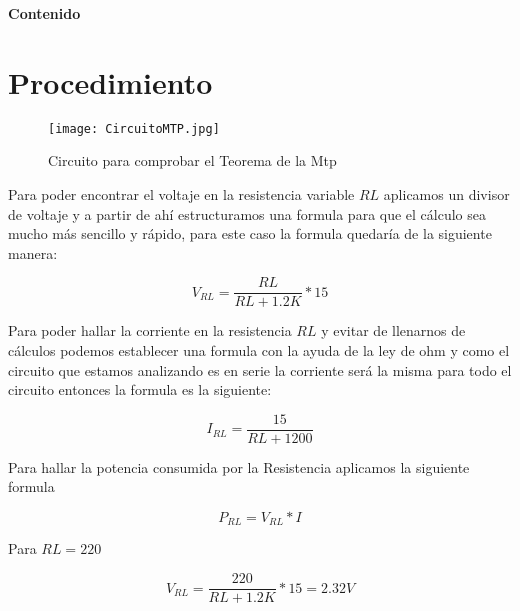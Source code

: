 \documentclass[a4paper, 11pt]{article}
\begin{document}
\textbf{}
\newpage

\begin{flushright}
\textbf{\Huge Contenido}
\end{flushright}

\renewcommand*\contentsname{}
{%
\tableofcontents
}



\newpage

\section{Procedimiento}

\begin{figure}[h]
\texttt{[image: CircuitoMTP.jpg]}
\caption{Circuito para comprobar el Teorema de la Mtp}
\end{figure}

Para poder encontrar el voltaje en la resistencia variable $RL$ aplicamos un divisor de voltaje y a partir de ahí estructuramos una formula para que el cálculo sea mucho más sencillo y rápido, para este caso la formula quedaría de la siguiente manera:

\begin{equation*}
V_{RL}=\frac{RL}{RL+1.2K}*15
\end{equation*}

Para poder hallar la corriente en la resistencia $RL$ y evitar de llenarnos de cálculos podemos establecer una formula con la ayuda de la ley de ohm y como el circuito que estamos analizando es en serie la corriente será la misma para  todo el circuito entonces la formula es  la siguiente:

\begin{equation*}
I_{RL}=\frac{15}{RL+1200}
\end{equation*}

Para hallar la potencia consumida por la Resistencia aplicamos la siguiente formula

\begin{equation*}
P_{RL}=V_{RL}*I
\end{equation*}

Para $RL=220$

\begin{equation*}
V_{RL}=\frac{220}{RL+1.2K}*15=2.32V
\end{equation*}
\end{document}
